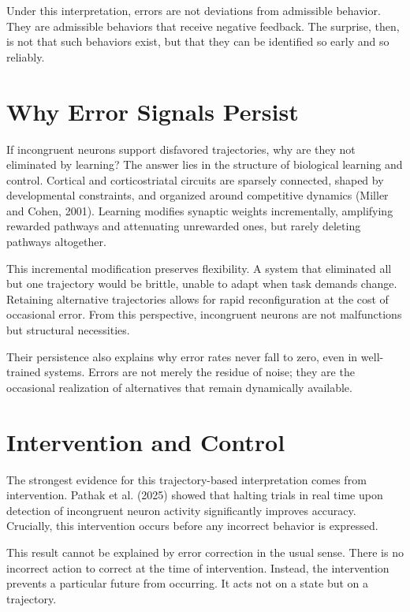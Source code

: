 \documentclass[11pt]{article}
\begin{document}
Under this interpretation, errors are not deviations from admissible behavior. They are admissible behaviors that receive negative feedback. The surprise, then, is not that such behaviors exist, but that they can be identified so early and so reliably.

\section{Why Error Signals Persist}

If incongruent neurons support disfavored trajectories, why are they not eliminated by learning? The answer lies in the structure of biological learning and control. Cortical and corticostriatal circuits are sparsely connected, shaped by developmental constraints, and organized around competitive dynamics (Miller and Cohen, 2001). Learning modifies synaptic weights incrementally, amplifying rewarded pathways and attenuating unrewarded ones, but rarely deleting pathways altogether.

This incremental modification preserves flexibility. A system that eliminated all but one trajectory would be brittle, unable to adapt when task demands change. Retaining alternative trajectories allows for rapid reconfiguration at the cost of occasional error. From this perspective, incongruent neurons are not malfunctions but structural necessities.

Their persistence also explains why error rates never fall to zero, even in well-trained systems. Errors are not merely the residue of noise; they are the occasional realization of alternatives that remain dynamically available.

\section{Intervention and Control}

The strongest evidence for this trajectory-based interpretation comes from intervention. Pathak et al. (2025) showed that halting trials in real time upon detection of incongruent neuron activity significantly improves accuracy. Crucially, this intervention occurs before any incorrect behavior is expressed.

This result cannot be explained by error correction in the usual sense. There is no incorrect action to correct at the time of intervention. Instead, the intervention prevents a particular future from occurring. It acts not on a state but on a trajectory.
\end{document}
